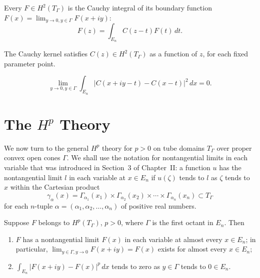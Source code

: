 \begin{theorem}\label{thm:c3-4-9}
Every $F \in H^2(T_\Gamma)$ is the Cauchy integral of its boundary function $F(x) = \lim_{y \to 0, y \in \Gamma} F(x + iy)$:
\begin{equation}\label{eq:c3-4-10}
F(z) = \int_{E_n} C(z - t) F(t)\,dt.
\end{equation}
\end{theorem}

\begin{lemma}\label{lem:c3-4-11}
The Cauchy kernel satisfies $C(z) \in H^2(T_\Gamma)$ as a function of $z$, for each fixed parameter point.
\end{lemma}

\begin{equation}\label{eq:c3-4-12}
\lim_{y \to 0, y \in \Gamma} \int_{E_n} |C(x + iy - t) - C(x - t)|^2\,dx = 0.
\end{equation}

\section{The \texorpdfstring{$H^p$}{Hp} Theory}

We now turn to the general $H^p$ theory for $p > 0$ on tube domains $T_\Gamma$ over proper convex open cones $\Gamma$. We shall use the notation for nontangential limits in each variable that was introduced in Section~3 of Chapter~II: a function $u$ has the nontangential limit $l$ in each variable at $x \in E_n$ if $u(\zeta)$ tends to $l$ as $\zeta$ tends to $x$ within the Cartesian product
\[
\gamma_\alpha(x) = \Gamma_{\alpha_1}(x_1) \times \Gamma_{\alpha_2}(x_2) \times \cdots \times \Gamma_{\alpha_n}(x_n) \subset T_\Gamma
\]
for each $n$-tuple $\alpha = (\alpha_1, \alpha_2, \dots, \alpha_n)$ of positive real numbers.

\begin{theorem}\label{thm:c3-5-1}
Suppose $F$ belongs to $H^p(T_\Gamma)$, $p > 0$, where $\Gamma$ is the first octant in $E_n$. Then
\begin{enumerate}
\item[(a)] $F$ has a nontangential limit $F(x)$ in each variable at almost every $x \in E_n$; in particular, $\lim_{y \in \Gamma, y \to 0} F(x + iy) = F(x)$ exists for almost every $x \in E_n$;
\item[(b)] $\int_{E_n} |F(x + iy) - F(x)|^p\,dx$ tends to zero as $y \in \Gamma$ tends to $0 \in E_n$.
\end{enumerate}
\end{theorem}

